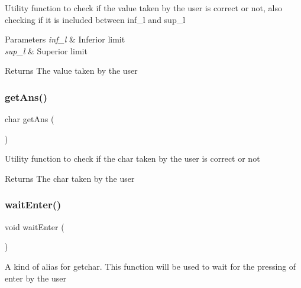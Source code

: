 Utility function to check if the value taken by the user is correct or not, also checking if it is included between inf\+\_\+l and sup\+\_\+l 
\begin{DoxyParams}{Parameters}
{\em inf\+\_\+l} & Inferior limit \\
\hline
{\em sup\+\_\+l} & Superior limit \\
\hline
\end{DoxyParams}
\begin{DoxyReturn}{Returns}
The value taken by the user 
\end{DoxyReturn}
\mbox{\label{group__system_ga8e246608287303651a79bf1e940502ab}} 
\subsubsection{\texorpdfstring{get\+Ans()}{getAns()}}
{\footnotesize\ttfamily char get\+Ans (\begin{DoxyParamCaption}{ }\end{DoxyParamCaption})}

Utility function to check if the char taken by the user is correct or not \begin{DoxyReturn}{Returns}
The char taken by the user 
\end{DoxyReturn}
\mbox{\label{group__system_gac403fa21ccf75b7ec08e5dbdeafbfc04}} 
\subsubsection{\texorpdfstring{wait\+Enter()}{waitEnter()}}
{\footnotesize\ttfamily void wait\+Enter (\begin{DoxyParamCaption}{ }\end{DoxyParamCaption})}

A kind of alias for getchar. This function will be used to wait for the pressing of enter by the user \mbox{\label{group__system_ga6bf4df1581f8838ed8735026ca64828b}} 
